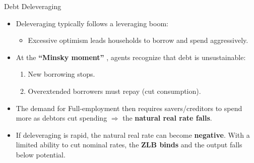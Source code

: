 \documentclass[11pt,aspectratio=169]{beamer}
\begin{document}
\begin{frame}{Debt Deleveraging}
\small
\begin{itemize}
  \item Deleveraging typically follows a leveraging boom:
  \begin{itemize}
    \item Excessive optimism leads households to borrow and spend aggressively.
  \end{itemize}
  \vspace{0.3em}
  \item At the \textbf{``Minsky moment''} \parencite{EggertssonKrugman2012DebtDeleveragingLiquidityTrap},
  agents recognize that debt is unsustainable:
  \begin{enumerate}
    \item New borrowing stops.
    \item Overextended borrowers must repay (cut consumption).
  \end{enumerate}
  \vspace{0.3em}
  \item The demand for Full-employment then requires savers/creditors to spend more as debtors cut spending $\Rightarrow$ the \textbf{natural real rate falls}.
  \vspace{0.3em}
  \item If deleveraging is rapid, the natural real rate can become \textbf{negative}. With a limited ability to cut nominal rates, the \textbf{ZLB binds} and the output falls below potential.
\end{itemize}
\end{frame}
\end{document}
